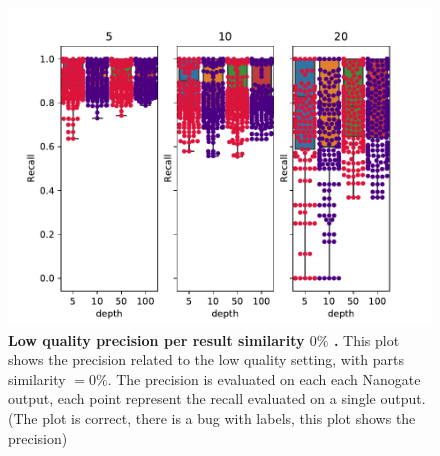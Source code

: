 \documentclass[11pt, a4paper]{article}
\begin{document}
 \begin{figure}[ht]
    \begin{center}
    \includegraphics[width=1.35\textwidth]{../results/images_notebook/v_460/lq_sim_00_precision_per_result.pdf}
    \end{center}
    \caption{{\bf Low quality precision per result similarity $0\%$ .}  This plot shows the precision related to the low quality setting, with parts similarity $=0\%$. The precision is evaluated on each each Nanogate output, each point represent the recall evaluated on a single output. (The plot is correct, there is a bug with labels, this plot shows the precision)}
   \label{fig:v_460_lq_sim_00_precision_per_result}
\end{figure}
\end{document}
